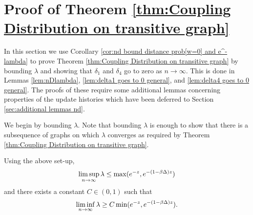 \section{Proof of Theorem \ref{thm:Coupling Distribution on transitive graph}}
\label{sec:proof thm coupling nd}
	In this section we use Corollary \ref{cor:nd bound distance prob[w=0] and e^-lambda} to prove Theorem \ref{thm:Coupling Distribution on transitive graph} by bounding $\lambda$ and showing that $\delta_1$ and $\delta_4$ go to zero as $n \rightarrow \infty$. This is done in Lemmas \ref{lem:nDlambda}, \ref{lem:delta1 goes to 0 general}, and \ref{lem:delta4 goes to 0 general}. The proofs of these require some additional lemmas concerning properties of the update histories which have been deferred to Section \ref{sec:additional lemmas nd}.

	We begin by bounding $\lambda$. Note that bounding $\lambda$ is enough to show that there is a subsequence of graphs on which $\lambda$ converges as required by Theorem \ref{thm:Coupling Distribution on transitive graph}.
	\begin{lemma}
	\label{lem:nDlambda}
		Using the above set-up, 
		\begin{equation}
			\limsup_{n \rightarrow \infty} \lambda \leq \max(e^{-z}, e^{-(1 - \beta\Delta)z})
		\end{equation}
		and there exists a constant $C \in (0,1)$ such that
		\begin{equation}
			\liminf_{n \rightarrow \infty} \lambda \geq C \min(e^{-z}, e^{-(1 - \beta\Delta)z}).
		\end{equation}
	\end{lemma}
